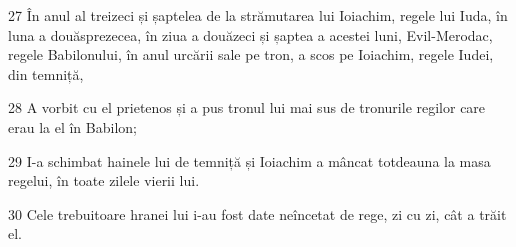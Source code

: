 \par 27 În anul al treizeci și șaptelea de la strămutarea lui Ioiachim, regele lui Iuda, în luna a douăsprezecea, în ziua a douăzeci și șaptea a acestei luni, Evil-Merodac, regele Babilonului, în anul urcării sale pe tron, a scos pe Ioiachim, regele Iudei, din temniță,
\par 28 A vorbit cu el prietenos și a pus tronul lui mai sus de tronurile regilor care erau la el în Babilon;
\par 29 I-a schimbat hainele lui de temniță și Ioiachim a mâncat totdeauna la masa regelui, în toate zilele vierii lui.
\par 30 Cele trebuitoare hranei lui i-au fost date neîncetat de rege, zi cu zi, cât a trăit el.


